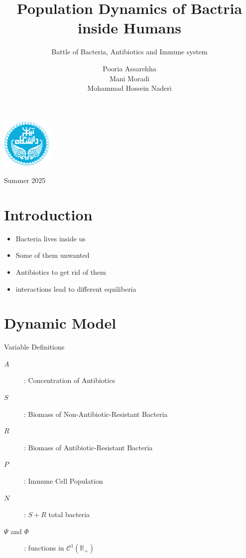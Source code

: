 \documentclass{beamer}
\title[Bacterial Dynamics]{Population Dynamics of Bactria inside Humans}
\subtitle{Battle of Bacteria, Antibiotics and Immune system}
\author[Pooria Mani Naderi]{\small Pooria Assarehha \\ \vspace{-3mm} Mani Moradi \\ \vspace{-3mm} Mohammad Hossein Naderi}
\institute[Dep. Math, Stat \& CS]{Department of Mathematics, Statistics \\ \vspace{-2mm} and Computer Science}
\date{\empty}
\begin{document}
\graphicspath{{../figs/}}

\begin{frame}
    \titlepage
    \vspace{-1.5cm}
    \begin{center}
        \includegraphics[width=0.18\textwidth]{ut.png}
    \end{center}
    \vspace{-5mm}
    \centering \small Summer 2025
\end{frame}


\section{Introduction}
\begin{frame}
  \begin{itemize}
    \item Bacteria lives inside us
    \item Some of them unwanted
    \item Antibiotics to get rid of them
    \item interactions lead to different equiliberia
  \end{itemize}
\end{frame}

\section{Dynamic Model}

\begin{frame}{Variable Definitions}
  \begin{description}
    \item[$A$]: Concentration of Antibiotics 
    \item[$S$]: Biomass of Non-Antibiotic-Resistant Bacteria 
    \item[$R$]: Biomass of Antibiotic-Resistant Bacteria
    \item[$P$]: Immune Cell Population
    \item[$N$]: $S + R$ total bacteria   
    \item[$\Psi$ and $\Phi$]: functions in \(\mathcal{C}^1(\mathbb{R}_+)\)
  \end{description}
\end{frame}
\end{document}
